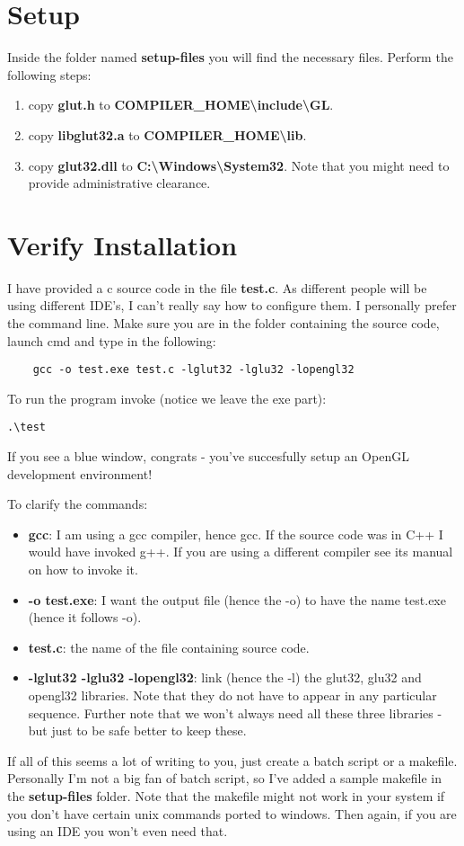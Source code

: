 \documentclass{article}
\begin{document}
\section{Setup}
Inside the folder named \textbf{setup-files} you will find the necessary files.
Perform the following steps:
\begin{enumerate}
\item copy \textbf{glut.h} to \textbf{COMPILER\_HOME\textbackslash include\textbackslash GL}.
\item copy \textbf{libglut32.a} to \textbf{COMPILER\_HOME\textbackslash lib}.
\item copy \textbf{glut32.dll} to \textbf{C:\textbackslash Windows\textbackslash System32}.
Note that you might need to provide administrative clearance.
\end{enumerate}


\section{Verify Installation}
I have provided a c source code in the file \textbf{test.c}.
As different people will be using different IDE's, I can't really say how to configure them.
I personally prefer the command line.
Make sure you are in the folder containing the source code, launch cmd and type in the following:
\begin{verbatim}
	gcc -o test.exe test.c -lglut32 -lglu32 -lopengl32
\end{verbatim}
To run the program invoke (notice we leave the exe part):
\begin{verbatim}
.\test
\end{verbatim}
If you see a blue window, congrats - you've succesfully setup an OpenGL development environment!

To clarify the commands:
\begin{itemize}
\item \textbf{gcc}: I am using a gcc compiler, hence gcc. If the source code was in C++ I would have invoked g++.
If you are using a different compiler see its manual on how to invoke it.
\item \textbf{-o test.exe}: I want the output file (hence the -o) to have the name test.exe (hence it follows -o).
\item \textbf{test.c}: the name of the file containing source code.
\item \textbf{-lglut32 -lglu32 -lopengl32}: link (hence the -l) the glut32, glu32 and opengl32 libraries.
Note that they do not have to appear in any particular sequence.
Further note that we won't always need all these three libraries - but just to be safe better to keep these.
\end{itemize}

If all of this seems a lot of writing to you, just create a batch script or a makefile.
Personally I'm not a big fan of batch script, so I've added a sample makefile in the \textbf{setup-files} folder.
Note that the makefile might not work in your system if you don't have certain unix commands ported to windows.
Then again, if you are using an IDE you won't even need that.
\end{document}
